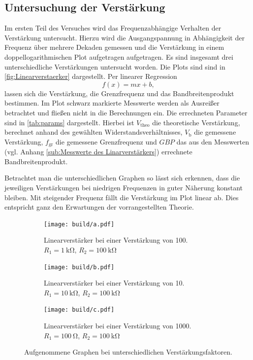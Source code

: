 \subsection{Untersuchung der Verstärkung}
Im ersten Teil des Versuches wird das Frequenzabhängige Verhalten der Verstärkung untersucht.
Hierzu wird die Ausgangspannung in Abhängigkeit der Frequenz über mehrere Dekaden gemessen 
und die Verstärkung in einem doppellogarithmischen Plot aufgetragen aufgetragen.
Es sind insgesamt drei unterschiedliche Verstärkungen untersucht worden.
Die Plots sind sind in \autoref{fig:Linearverstaerker} dargestellt.
Per linearer Regression
\begin{equation*}
    f(x) = mx+b,
\end{equation*}
lassen sich die Verstärkung, die Grenzfrequenz und das Bandbreitenprodukt bestimmen.
Im Plot schwarz markierte Messwerte werden als Ausreißer betrachtet 
und fließen nicht in die Berechnungen ein.
Die errechneten Parameter sind in \autoref{tab:params} dargestellt.
Hierbei ist $V_\text{theo}$ die theoretische Verstärkung, berechnet anhand des gewählten 
Widerstandsverhältnisses, $V_\text{b}$ die gemessene Verstärkung, $f_\text{gr}$ die 
gemessene Grenzfrequenz und $GBP$ das aus den Messwerten 
(vgl. Anhang \ref{sub:Messwerte des Linarverstärkers}) errechnete Bandbreitenprodukt.

\FloatBarrier
Betrachtet man die unterschiedlichen Graphen so lässt sich erkennen, dass
die jeweiligen Verstärkungen bei niedrigen Frequenzen in guter Näherung konstant
bleiben. Mit steigender Frequenz fällt die Verstärkung im Plot linear ab.
Dies entspricht ganz den Erwartungen der vorrangestellten Theorie.
\begin{figure}
    \centering
    \begin{subfigure}[b]{0.45\textwidth}
        \centering
        \texttt{[image: build/a.pdf]}
        \caption{Linearverstärker bei einer Verstärkung von 100. $R_1 = \SI{1}{\kilo\ohm}$,
        $R_2 = \SI{100}{\kilo\ohm}$ }
        \label{fig:a}
    \end{subfigure}
    \hfill
    \begin{subfigure}[b]{0.45\textwidth}
        \centering
        \texttt{[image: build/b.pdf]}
        \caption{Linearverstärker bei einer Verstärkung von 10. $R_1 = \SI{10}{\kilo\ohm}$,
        $R_2 = \SI{100}{\kilo\ohm}$ }
        \label{fig:b}
    \end{subfigure}
    \newline
    \newline    
    \newline    
    \newline    
    \begin{subfigure}[b]{0.45\textwidth}
        \centering
        \texttt{[image: build/c.pdf]}
        \caption{Linearverstärker bei einer Verstärkung von 1000. $R_1 = \SI{100}{\ohm}$,
        $R_2 = \SI{100}{\kilo\ohm}$ }
        \label{fig:c}
    \end{subfigure}
       \caption{Aufgenommene Graphen bei unterschiedlichen Verstärkungsfaktoren.}
       \label{fig:Linearverstaerker}
\end{figure}
\FloatBarrier

